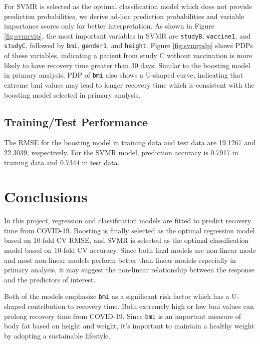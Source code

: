 \documentclass[11pt]{article}
\begin{document}
For SVMR is selected as the optimal classification model which does not provide prediction probabilities, we derive ad-hoc prediction probabilities and variable importance scores only for better interpretation. As shown in Figure \ref{fig:svmrvip}, the most important variables in SVMR are \texttt{studyB}, \texttt{vaccine1}, and \texttt{studyC}, followed by \texttt{bmi}, \texttt{gender1}, and \texttt{height}. Figure \ref{fig:svmrpdp} shows PDPs of these variables, indicating a patient from study C without vaccination is more likely to have recovery time greater than 30 days. Similar to the boosting model in primary analysis, PDP of \texttt{bmi} also shows a U-shaped curve, indicating that extreme bmi values may lead to longer recovery time which is consistent with the boosting model selected in primary analysis.

\subsection{Training/Test Performance}

The RMSE for the boosting model in training data and test data are 19.1267 and 22.3039, respectively. For the SVMR model, prediction accuracy is 0.7917 in training data and 0.7344 in test data.

\section{Conclusions}

In this project, regression and classification models are fitted to predict recovery time from COVID-19. Boosting is finally selected as the optimal regression model based on 10-fold CV RMSE, and SVMR is selected as the optimal classification model based on 10-fold CV accuracy. Since both final models are non-linear mode and most non-linear models perform better than linear models especially in primary analysis, it may suggest the non-linear relationship between the response and the predictors of interest. 

Both of the models emphasize \texttt{bmi} as a significant risk factor which has a U-shaped contribution to recovery time. Both extremely high or low bmi values can prolong recovery time from COVID-19. Since \texttt{bmi} is an important measure of body fat based on height and weight, it’s important to maintain a healthy weight by adopting a sustainable lifestyle.
\end{document}
